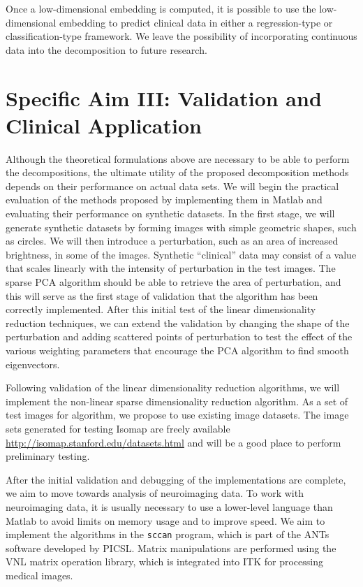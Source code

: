 \documentclass[11pt]{nih}
\begin{document}
Once a low-dimensional embedding is computed, it is possible to use the low-dimensional embedding to predict clinical data in either a  regression-type or classification-type framework.  We leave the possibility of incorporating continuous data into the decomposition to future research.  

\section*{Specific Aim III: Validation and Clinical Application}
Although the theoretical formulations above are necessary to be able to perform the decompositions, the ultimate utility of the proposed decomposition methods depends on their performance on actual data sets.  We will begin the practical evaluation of the methods proposed by implementing them in Matlab and evaluating their performance on synthetic datasets.  In the first stage, we will generate synthetic datasets by forming images with simple geometric shapes, such as circles.  We will then introduce a perturbation, such as an area of increased brightness, in some of the images.  Synthetic ``clinical'' data may consist of a value that scales linearly with the intensity of perturbation in the test images.  The sparse PCA algorithm should be able to retrieve the area of perturbation, and this will serve as the first stage of validation that the algorithm has been correctly implemented.  After this initial test of the linear dimensionality reduction techniques, we can extend the validation by changing the shape of the perturbation and adding scattered points of perturbation to test the effect of the various weighting parameters that encourage the PCA algorithm to find smooth eigenvectors.  

Following validation of the linear dimensionality reduction algorithms, we will implement the non-linear sparse dimensionality reduction algorithm.  As a set of test images for algorithm, we propose to use existing image datasets.  The image sets generated for testing Isomap \cite{tenenbaum_global_2000} are freely available \url{http://isomap.stanford.edu/datasets.html} and will be a good place to perform preliminary testing.  

After the initial validation and debugging of the implementations are complete, we aim to move towards analysis of neuroimaging data.  To work with neuroimaging data, it is usually necessary to use a lower-level language than Matlab to avoid limits on memory usage and to improve speed.  We aim to implement the algorithms in the \verb=sccan= program, which is part of the ANTs software developed by PICSL.  Matrix manipulations are performed using the VNL matrix operation library, which is integrated into ITK for processing medical images.  
\end{document}
